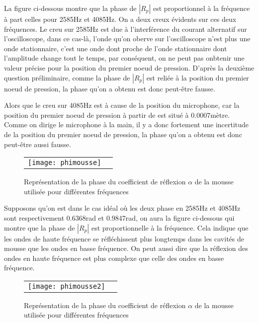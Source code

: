 \documentclass[a4paper,11pt]{article}
\begin{document}
La figure ci-dessous montre que la phase de $|R_{p}|$ est proportionnel à la fréquence à part celles pour 2585Hz et 4085Hz. On a deux creux évidents sur ces deux fréquences. Le creu sur 2585Hz est due à l'interférence du courant alternatif sur l'oscilloscope, dans ce cas-là, l'onde qu'on oberve sur l'oscilloscope n'est plus une onde stationnaire, c'est une onde dont proche de l'onde stationnaire dont l'amplitude change tout le temps, par conséquent, on ne peut pas onbtenir une valeur précise pour la position du premier noeud de pression. D'après la deuxième question préliminaire, comme la phase de $|R_{p}|$ est reliée à la position du premier noeud de pression, la phase qu'on a obtenu est donc peut-être fausse. 

Alors que le creu sur 4085Hz est à cause de la position du microphone, car la position du premier noeud de pression à partir de est situé à 0.0007mètre. Comme on dirige le microphone à la main, il y a donc fortement une incertitude de la position du premier noeud de pression, la phase qu'on a obtenu est donc peut-être aussi fausse.

\begin{figure}[h]
\centering
\begin{tabular}{cc}
 \texttt{[image: phimousse]}\\
\end{tabular}
\caption{Représentation de la phase du coefficient de réflexion $\alpha$ de la mousse utilisée pour différentes fréquences}
\end{figure}


Supposons qu'on est dans le cas idéal où les deux phase en 2585Hz et 4085Hz sont respectivement 0.6368rad et 0.9847rad, on aura la figure ci-dessous qui montre que la phase de $|R_{p}|$ est proportionnelle à la fréquence. Cela indique que les ondes de haute fréquence se réfléchissent plus longtemps dans les cavités de mousse que les ondes en basse fréquence. On peut aussi dire que  la réflexion des ondes en haute fréquence est plus complexe que celle des ondes en basse fréquence.



\begin{figure}
\centering
\begin{tabular}{cc}
 \texttt{[image: phimousse2]}\\
\end{tabular}
\caption{Représentation de la phase du coefficient de réflexion $\alpha$ de la mousse utilisée pour différentes fréquences}
\end{figure}
\end{document}

